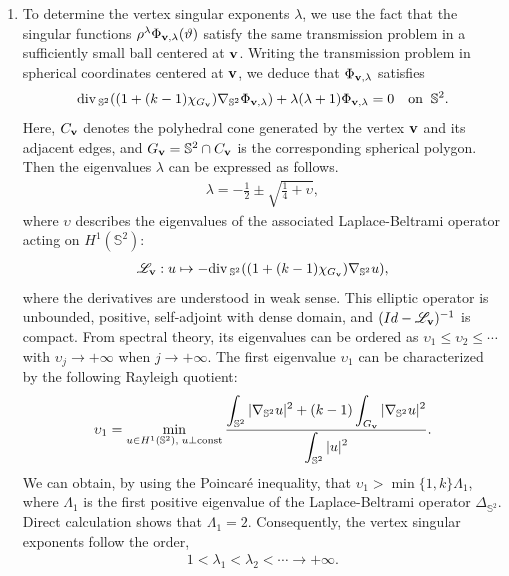 ﻿\documentclass[11pt,reqno,oneside]{amsart}
\theoremstyle{definition}
\theoremstyle{remark}
\newcommand{\dvg}{{\rm div}\,}
\renewcommand{\S}{\mathbb{S}}
\newcommand{\Lop}{\mathscr{L}}
\newcommand{\n}{\nabla}
\newcommand{\lm}{\lambda}
\newcommand{\ds}{\displaystyle}
\begin{document}
\begin{enumerate}
        \item To determine the vertex singular exponents $\lm$, we use the fact that the singular functions $\rho^\lm \Phi_{{\bf v},\lm}(\vartheta)$ satisfy the same transmission problem in a sufficiently small ball centered at ${\bf v}$. Writing the transmission problem in spherical coordinates centered at ${\bf v}$, we deduce that $\Phi_{{\bf v},\lm}$ satisfies
        \begin{align*}
            \dvg_{\S^2}((1+(k-1)\chi_{G_{\bf v}})\n_{\S^2}\Phi_{{\bf v},\lm})+\lm(\lm+1)\Phi_{{\bf v},\lm}=0 \quad {\rm on}\;\; \S^2.
        \end{align*}
        Here, $C_{\bf v}$ denotes the polyhedral cone generated by the vertex ${\bf v}$ and its adjacent edges, and $G_{\bf v}=\S^2\cap C_{\bf v}$ is the corresponding spherical polygon. Then the eigenvalues $\lm$ can be expressed as follows.
        \begin{align*}
            \lm=-\frac{1}{2}\pm\sqrt{\frac{1}{4}+\upsilon},
        \end{align*}
        where $\upsilon$ describes the eigenvalues of the associated Laplace-Beltrami operator acting on $H^1(\S^2)$:
        \begin{align*}
            \Lop_{\bf v}: u\mapsto -\dvg_{\S^2}((1+(k-1)\chi_{G_{\bf v}})\n_{\S^2} u),
        \end{align*}
        where the derivatives are understood in weak sense. This elliptic operator is unbounded, positive, self-adjoint with dense domain, and $(Id-\Lop_{\bf v})^{-1}$ is compact. From spectral theory, its eigenvalues can be ordered as $\upsilon_1\leq \upsilon_2\leq \cdots$ with $\upsilon_j\rightarrow +\infty$ when $j\rightarrow +\infty$. The first eigenvalue $\upsilon_1$ can be characterized by the following Rayleigh quotient:
        \begin{align*}
            \upsilon_1=\min_{u\in H^1(\S^2),\; u \perp {\rm const}}\frac{\ds \int_{\S^2}|\n_{\S^2} u|^2+(k-1)\int_{G_{\bf v}}|\n_{\S^2} u|^2}{\ds \int_{\S^2}|u|^2}.
        \end{align*}
        We can obtain, by using the Poincar\'e inequality, that $\upsilon_1 > \min\{1,k\}\Lambda_1$, where $\Lambda_1$ is the first positive eigenvalue of the Laplace-Beltrami operator $\Delta_{\S^2}$. Direct calculation shows that $\Lambda_1=2$. Consequently, the vertex singular exponents follow the order,
        \begin{align}\label{eq:les-lm}
            1<\lm_1 < \lm_2 < \cdots \rightarrow +\infty.
        \end{align}

\end{enumerate}
\end{document}
